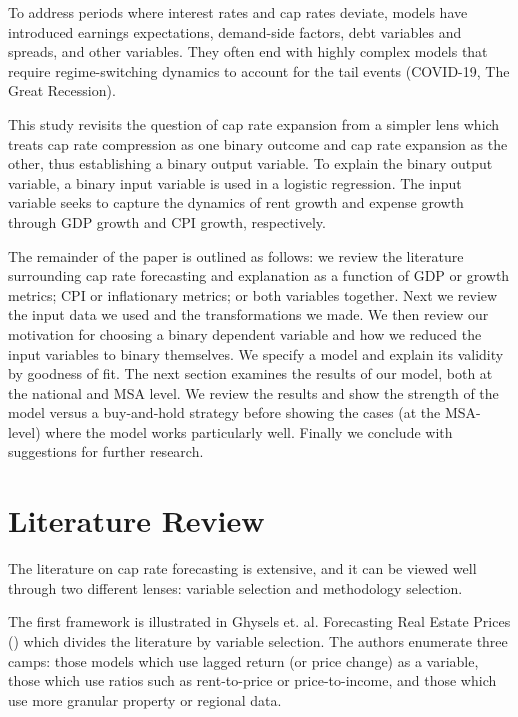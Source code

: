 To address periods where interest rates and cap rates deviate, models have introduced earnings expectations, demand-side factors, debt variables and spreads, and other variables. They often end with highly complex models that require regime-switching dynamics to account for the tail events (COVID-19, The Great Recession).

This study revisits the question of cap rate expansion from a simpler lens which treats cap rate compression as one binary outcome and cap rate expansion as the other, thus establishing a binary output variable. To explain the binary output variable, a binary input variable is used in a logistic regression. The input variable seeks to capture the dynamics of rent growth and expense growth through GDP growth and CPI growth, respectively. 

The remainder of the paper is outlined as follows: we review the literature surrounding cap rate forecasting and explanation as a function of GDP or growth metrics; CPI or inflationary metrics; or both variables together. Next we review the input data we used and the transformations we made. We then review our motivation for choosing a binary dependent variable and how we reduced the input variables to binary themselves. We specify a model and explain its validity by goodness of fit. The next section examines the results of our model, both at the national and MSA level. We review the results and show the strength of the model versus a buy-and-hold strategy before showing the cases (at the MSA-level) where the model works particularly well. Finally we conclude with suggestions for further research. 

\label{intro}


\section{Literature Review}

The literature on cap rate forecasting is extensive, and it can be viewed well through two different lenses: variable selection and methodology selection. 

The first framework is illustrated in Ghysels et. al. Forecasting Real Estate Prices (\citeyear{ghysels_plazzi_valkanov_torous_2013}) which divides the literature by variable selection. The authors enumerate three camps: those models which use lagged return (or price change) as a variable, those which use ratios such as rent-to-price or price-to-income, and those which use more granular property or regional data. 

